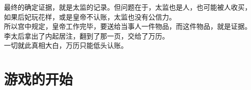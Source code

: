 \begin{multicols}{\theparacolNo}
最终的确定证据，就是太监的记录。但问题在于，太监也是人，也可能被人收买，如果后妃玩花样，或是皇帝不认账，太监也没有公信力。\\

所以宫中规定，皇帝工作完毕，要送给当事人一件物品，而这件物品，就是证据。\\

李太后拿出了内起居注，翻到了那一页，交给了万历。\\

一切就此真相大白，万历只能低头认账。\\

\ifnum{}
	\end{multicols}
\fi
\newpage
\section{游戏的开始}
\ifnum{}
